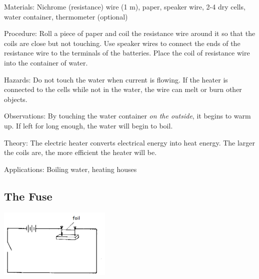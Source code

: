 \begin{multicols}{2}
\begin{description*}
\item[Materials:]{Nichrome (resistance) wire (1 m), paper, speaker wire, 2-4 dry cells, water container, thermometer (optional)}
\item[Procedure:]{Roll a piece of paper and coil the resistance wire around it so that the coils are close but not touching. Use speaker wires to connect the ends of the resistance wire to the terminals of the batteries. Place the coil of resistance wire into the container of water.}
\item[Hazards:]{Do not touch the water when current is flowing. If the heater is connected to the cells while not in the water, the wire can melt or burn other objects.}
\item[Observations:]{By touching the water container \emph{on the outside}, it begins to warm up. If left for long enough, the water will begin to boil.}
\item[Theory:]{The electric heater converts electrical energy into heat energy. The larger the coils are, the more efficient the heater will be.}
\item[Applications:]{Boiling water, heating houses}
\end{description*}

\subsection{The Fuse}

\begin{center}
\includegraphics[width=0.4\textwidth]{./img/source/fuse.png}
\end{center}


\end{multicols}
